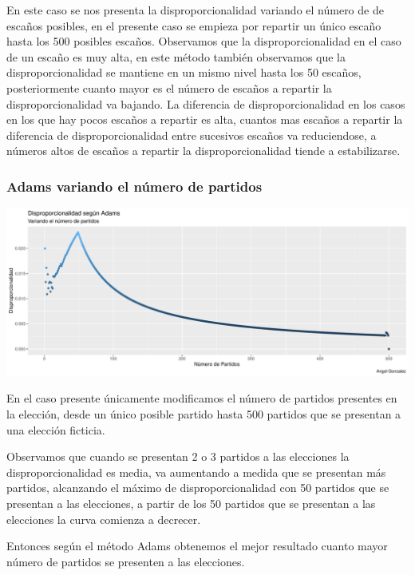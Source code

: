 \documentclass[12pt,a4paper,]{book}
\numberwithin{dummy}{section}
\theoremstyle{ocrenumbox}
\theoremstyle{blacknumex}
\theoremstyle{blacknumbox}
\theoremstyle{ocrenum}
\theoremstyle{ocrenum}
\begin{document}
En este caso se nos presenta la disproporcionalidad variando el número
de de escaños posibles, en el presente caso se empieza por repartir un
único escaño hasta los 500 posibles escaños. Observamos que la
disproporcionalidad en el caso de un escaño es muy alta, en este método
también observamos que la disproporcionalidad se mantiene en un mismo
nivel hasta los 50 escaños, posteriormente cuanto mayor es el número de
escaños a repartir la disproporcionalidad va bajando. La diferencia de
disproporcionalidad en los casos en los que hay pocos escaños a repartir
es alta, cuantos mas escaños a repartir la diferencia de
disproporcionalidad entre sucesivos escaños va reduciendose, a números
altos de escaños a repartir la disproporcionalidad tiende a
estabilizarse.

\hypertarget{adams-variando-el-nuxfamero-de-partidos}{%
\subsubsection{Adams variando el número de
partidos}\label{adams-variando-el-nuxfamero-de-partidos}}

\begin{center}\includegraphics[width=0.95\linewidth]{figurasR/unnamed-chunk-35-1} \end{center}

En el caso presente únicamente modificamos el número de partidos
presentes en la elección, desde un único posible partido hasta 500
partidos que se presentan a una elección ficticia.

Observamos que cuando se presentan 2 o 3 partidos a las elecciones la
disproporcionalidad es media, va aumentando a medida que se presentan
más partidos, alcanzando el máximo de disproporcionalidad con 50
partidos que se presentan a las elecciones, a partir de los 50 partidos
que se presentan a las elecciones la curva comienza a decrecer.

Entonces según el método Adams obtenemos el mejor resultado cuanto mayor
número de partidos se presenten a las elecciones.
\end{document}
